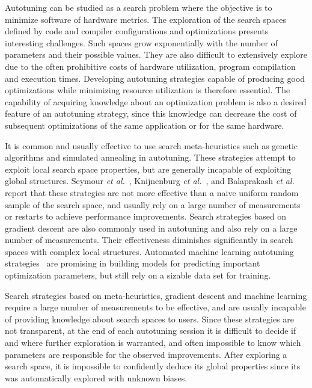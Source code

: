 \documentclass[conference]{IEEEtran}
\begin{document}
Autotuning can be studied as a search problem where the objective is to minimize
software of hardware metrics. The exploration of the search spaces defined by
code and compiler configurations and optimizations presents interesting
challenges. Such spaces grow exponentially with the number of parameters and
their possible values. They are also difficult to extensively explore due to the
often prohibitive costs of hardware utilization, program compilation and
execution times. Developing autotuning strategies capable of producing good
optimizations while minimizing resource utilization is therefore essential. The
capability of acquiring knowledge about an optimization problem is also a
desired feature of an autotuning strategy, since this knowledge can decrease the
cost of subsequent optimizations of the same application or for the same
hardware.

It is common and usually effective to use search meta-heuristics such as genetic
algorithms and simulated annealing in autotuning. These strategies attempt to
exploit local search space properties, but are generally incapable of exploiting
global structures. Seymour \emph{et al.}~\cite{seymour2008comparison},
Knijnenburg \emph{et al.}~\cite{knijnenburg2003combined}, and Balaprakash \emph{et
al.}~\cite{balaprakash2011can,balaprakash2012experimental} report that
these strategies are not more effective than a naive uniform random sample of
the search space, and usually rely on a large number of measurements or restarts
to achieve performance improvements. Search strategies based on gradient descent
are also commonly used in autotuning and also rely on a large number of
measurements. Their effectiveness diminishes significantly in search spaces with
complex local structures. Automated machine learning autotuning
strategies~\cite{beckingsale2017apollo,falch2017machine,balaprakash2016automomml}
are promising in building models for predicting important optimization
parameters, but still rely on a sizable data set for training.

Search strategies based on meta-heuristics, gradient descent and machine
learning require a large number of measurements to be effective, and are usually
incapable of providing knowledge about search spaces to users. Since these
strategies are not transparent, at the end of each autotuning session it is
difficult to decide if and where further exploration is warranted, and often
impossible to know which parameters are responsible for the observed
improvements. After exploring a search space, it is impossible to confidently
deduce its global properties since its was automatically explored with unknown
biases.
\end{document}
